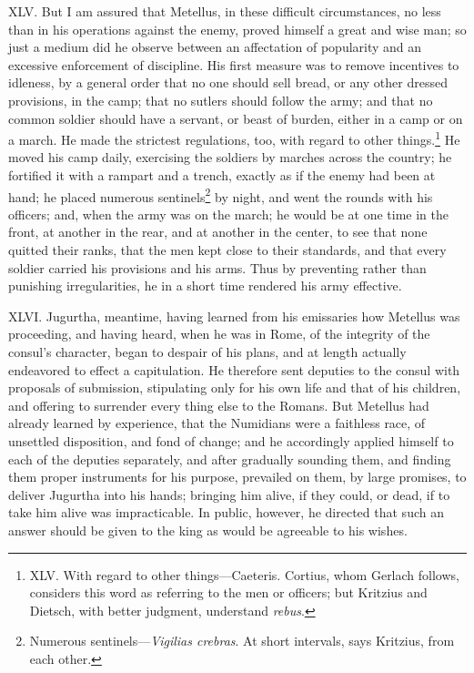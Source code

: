 XLV. But I am assured that Metellus, in these difficult circumstances,
no less than in his operations against the enemy, proved himself a
great and wise man; so just a medium did he observe between an
affectation of popularity and an excessive enforcement of discipline.
His first measure was to remove incentives to idleness, by a general
order that no one should sell bread, or any other dressed provisions,
in the camp; that no sutlers should follow the army; and that no
common soldier should have a servant, or beast of burden, either in a
camp or on a march. He made the strictest regulations, too, with
regard to other things.\footnote{XLV. With regard to other things—Caeteris. Cortius, whom
Gerlach follows, considers this word as referring to the men or
officers; but Kritzius and Dietsch, with better judgment, understand
\emph{rebus}.} He moved his camp daily, exercising the
soldiers by marches across the country; he fortified it with a rampart
and a trench, exactly as if the enemy had been at hand; he placed
numerous sentinels\footnote{Numerous sentinels—\emph{Vigilias crebras}. At short intervals,
says Kritzius, from each other.} by night, and went the rounds with his
officers; and, when the army was on the march; he would be at one time
in the front, at another in the rear, and at another in the center, to
see that none quitted their ranks, that the men kept close to their
standards, and that every soldier carried his provisions and his arms.
Thus by preventing rather than punishing irregularities, he in a short
time rendered his army effective.

XLVI. Jugurtha, meantime, having learned from his emissaries how
Metellus was proceeding, and having heard, when he was in Rome, of the
integrity of the consul's character, began to despair of his plans,
and at length actually endeavored to effect a capitulation. He
therefore sent deputies to the consul with proposals of submission,
stipulating only for his own life and that of his children, and
offering to surrender every thing else to the Romans. But Metellus had
already learned by experience, that the Numidians were a faithless
race, of unsettled disposition, and fond of change; and he accordingly
applied himself to each of the deputies separately, and after
gradually sounding them, and finding them proper instruments for his
purpose, prevailed on them, by large promises, to deliver Jugurtha
into his hands; bringing him alive, if they could, or dead, if to take
him alive was impracticable. In public, however, he directed that such
an answer should be given to the king as would be agreeable to his
wishes.

